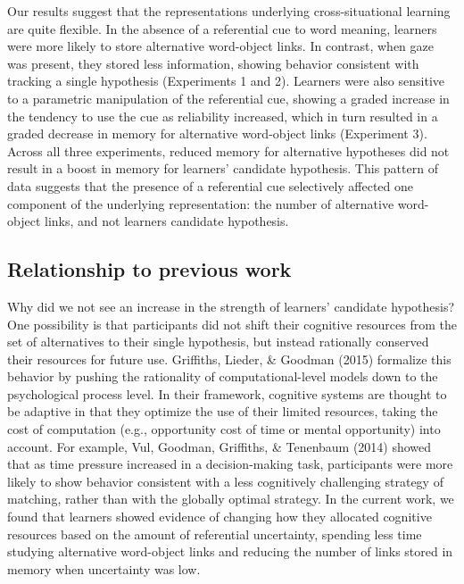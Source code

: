 \documentclass[authoryear, review]{elsarticle}
\begin{document}
Our results suggest that the representations underlying
cross-situational learning are quite flexible. In the absence of a
referential cue to word meaning, learners were more likely to store
alternative word-object links. In contrast, when gaze was present, they
stored less information, showing behavior consistent with tracking a
single hypothesis (Experiments 1 and 2). Learners were also sensitive to
a parametric manipulation of the referential cue, showing a graded
increase in the tendency to use the cue as reliability increased, which
in turn resulted in a graded decrease in memory for alternative
word-object links (Experiment 3). Across all three experiments, reduced
memory for alternative hypotheses did not result in a boost in memory
for learners' candidate hypothesis. This pattern of data suggests that
the presence of a referential cue selectively affected one component of
the underlying representation: the number of alternative word-object
links, and not learners candidate hypothesis.

\subsection{Relationship to previous
work}\label{relationship-to-previous-work}

Why did we not see an increase in the strength of learners' candidate
hypothesis? One possibility is that participants did not shift their
cognitive resources from the set of alternatives to their single
hypothesis, but instead rationally conserved their resources for future
use. Griffiths, Lieder, \& Goodman (2015) formalize this behavior by
pushing the rationality of computational-level models down to the
psychological process level. In their framework, cognitive systems are
thought to be adaptive in that they optimize the use of their limited
resources, taking the cost of computation (e.g., opportunity cost of
time or mental opportunity) into account. For example, Vul, Goodman,
Griffiths, \& Tenenbaum (2014) showed that as time pressure increased in
a decision-making task, participants were more likely to show behavior
consistent with a less cognitively challenging strategy of matching,
rather than with the globally optimal strategy. In the current work, we
found that learners showed evidence of changing how they allocated
cognitive resources based on the amount of referential uncertainty,
spending less time studying alternative word-object links and reducing
the number of links stored in memory when uncertainty was low.
\end{document}
